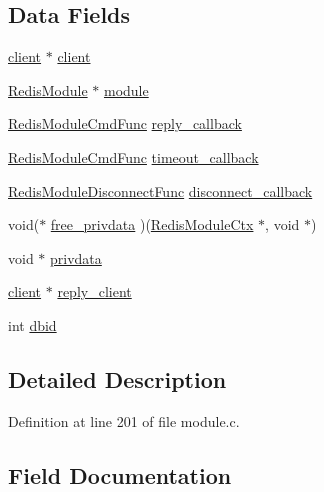 \subsection*{Data Fields}
\begin{DoxyCompactItemize}
\item 
\hyperlink{structclient}{client} $\ast$ \hyperlink{struct_redis_module_blocked_client_a6d99956d3d06c98958feb17baf491c71}{client}
\item 
\hyperlink{struct_redis_module}{Redis\+Module} $\ast$ \hyperlink{struct_redis_module_blocked_client_a9b71e67bccc12e40caf1d263db4172f3}{module}
\item 
\hyperlink{redismodule_8h_afd84062b24c2151cf8f2a53b955f9eed}{Redis\+Module\+Cmd\+Func} \hyperlink{struct_redis_module_blocked_client_ab1ad2ba0d6d49066ac12d91dd71eaa9e}{reply\+\_\+callback}
\item 
\hyperlink{redismodule_8h_afd84062b24c2151cf8f2a53b955f9eed}{Redis\+Module\+Cmd\+Func} \hyperlink{struct_redis_module_blocked_client_ad5b2a934fdf4cacf6ea5126c4ae31bf6}{timeout\+\_\+callback}
\item 
\hyperlink{redismodule_8h_a018e927d445b896dc38572db79f4907c}{Redis\+Module\+Disconnect\+Func} \hyperlink{struct_redis_module_blocked_client_a9fd300fed0252624be5cd1d87c1e9a2c}{disconnect\+\_\+callback}
\item 
void($\ast$ \hyperlink{struct_redis_module_blocked_client_a09d89fa730dac748044db7cfcb19ef1d}{free\+\_\+privdata} )(\hyperlink{struct_redis_module_ctx}{Redis\+Module\+Ctx} $\ast$, void $\ast$)
\item 
void $\ast$ \hyperlink{struct_redis_module_blocked_client_ac5df247494dd66a10946e2d67e56b2a1}{privdata}
\item 
\hyperlink{structclient}{client} $\ast$ \hyperlink{struct_redis_module_blocked_client_a09bd4914134a6336a5c03d4546ce0ba1}{reply\+\_\+client}
\item 
int \hyperlink{struct_redis_module_blocked_client_adc62368127157e2b3ff9cabe77f4f337}{dbid}
\end{DoxyCompactItemize}


\subsection{Detailed Description}


Definition at line 201 of file module.\+c.



\subsection{Field Documentation}
\mbox{\label{struct_redis_module_blocked_client_a6d99956d3d06c98958feb17baf491c71}} 
